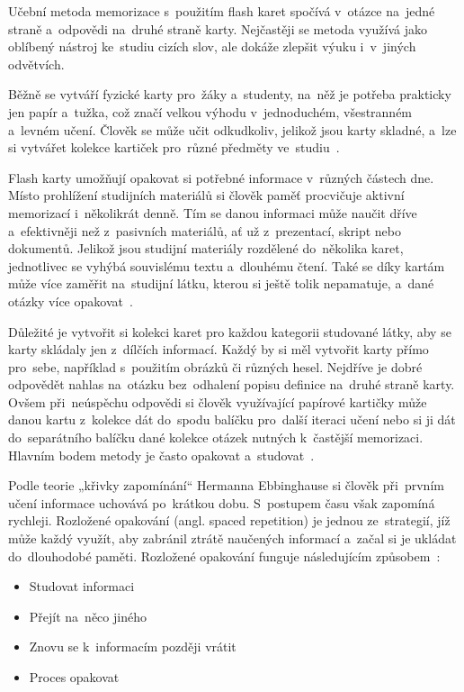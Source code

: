 \documentclass[twoside]{ctuthesis}
\begin{document}
Učební metoda memorizace s~použitím flash karet spočívá v~otázce na~jedné straně a~odpovědi na~druhé straně karty. Nejčastěji se metoda využívá jako oblíbený nástroj ke~studiu cizích slov, ale dokáže zlepšit výuku i~v~jiných odvětvích.

Běžně se vytváří fyzické karty pro~žáky a~studenty, na~něž je potřeba prakticky jen papír a~tužka, což značí velkou výhodu v~jednoduchém, všestranném a~levném učení. Člověk se může učit odkudkoliv, jelikož jsou karty skladné, a~lze si vytvářet kolekce kartiček pro~různé předměty ve~studiu~\cite{twinkl, poustka}.

Flash karty umožňují opakovat si potřebné informace v~různých částech dne. Místo prohlížení studijních materiálů si člověk paměť procvičuje aktivní memorizací i~několikrát denně. Tím se danou informaci může naučit dříve a~efektivněji než z~pasivních materiálů, ať už z~prezentací, skript nebo dokumentů. Jelikož jsou studijní materiály rozdělené do~několika karet, jednotlivec se vyhýbá souvislému textu a~dlouhému čtení. Také se díky kartám může více zaměřit na~studijní látku, kterou si ještě tolik nepamatuje, a~dané otázky více opakovat~\cite{maine}.

Důležité je vytvořit si kolekci karet pro každou kategorii studované látky, aby se karty skládaly jen z~dílčích informací. Každý by si měl vytvořit karty přímo pro~sebe, například s~použitím obrázků či různých hesel. Nejdříve je dobré odpovědět nahlas na~otázku bez~odhalení popisu definice na~druhé straně karty. Ovšem při~neúspěchu odpovědi si člověk využívající papírové kartičky může danou kartu z~kolekce dát do~spodu balíčku pro~další iteraci učení nebo si ji dát do~separátního balíčku dané kolekce otázek nutných k~častější memorizaci. Hlavním bodem metody je často opakovat a~studovat~\cite{maine}.

\newpage

Podle teorie „křivky zapomínání“ Hermanna Ebbinghause si člověk při~prvním učení informace uchovává po~krátkou dobu. S~postupem času však zapomíná rychleji. Rozložené opakování (angl. spaced repetition) je jednou ze~strategií, jíž může každý využít, aby zabránil ztrátě naučených informací a~začal si je ukládat do~dlouhodobé paměti. Rozložené opakování funguje následujícím způsobem~\cite{twinkl}:

\begin{itemize}
\item Studovat informaci
\item Přejít na~něco jiného
\item Znovu se k~informacím později vrátit
\item Proces opakovat
\end{itemize}
\end{document}
